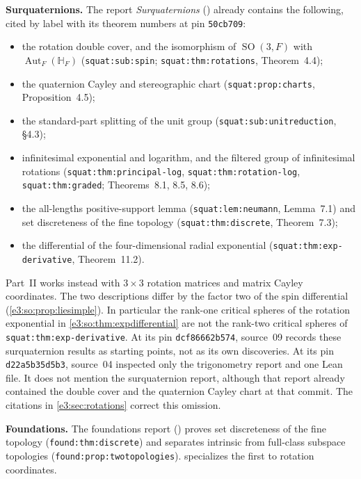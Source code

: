 \documentclass[11pt,letterpaper]{article}
\numberwithin{equation}{section}
\theoremstyle{definition}
\theoremstyle{remark}
\newcommand{\HH}{\mathbb H}
\newcommand{\SO}{\operatorname{SO}}
\newcommand{\Aut}{\operatorname{Aut}}
\begin{document}
\textbf{Surquaternions.} The report \emph{Surquaternions}
() \cite{RepoQuaternion} already
contains the following, cited by label with its theorem numbers at pin
\texttt{50cb709}:
\begin{itemize}
\item the rotation double cover, and the isomorphism of $\SO(3,F)$ with
 $\Aut_F(\HH_F)$ (\texttt{squat:sub:spin}; \texttt{squat:thm:rotations},
 Theorem~4.4);
\item the quaternion Cayley and stereographic chart (\texttt{squat:prop:charts},
 Proposition~4.5);
\item the standard-part splitting of the unit group
 (\texttt{squat:sub:unitreduction}, \S4.3);
\item infinitesimal exponential and logarithm, and the filtered group of
 infinitesimal rotations (\texttt{squat:thm:principal-log},
 \texttt{squat:thm:rotation-log}, \texttt{squat:thm:graded}; Theorems~8.1,
 8.5, 8.6);
\item the all-lengths positive-support lemma (\texttt{squat:lem:neumann},
 Lemma~7.1) and set discreteness of the fine topology
 (\texttt{squat:thm:discrete}, Theorem~7.3);
\item the differential of the four-dimensional radial exponential
 (\texttt{squat:thm:exp-derivative}, Theorem~11.2).
\end{itemize}
Part~II works instead with $3\times3$ rotation matrices and matrix Cayley
coordinates. The two descriptions differ by the factor two of the spin
differential (\cref{e3:so:prop:liesimple}). In particular the rank-one critical
spheres of the rotation exponential in \cref{e3:so:thm:expdifferential} are not
the rank-two critical spheres of \texttt{squat:thm:exp-derivative}. At its pin
\texttt{dcf86662b574}, source~09 records these surquaternion results as starting
points, not as its own discoveries. At its pin \texttt{d22a5b35d5b3}, source~04
inspected only the trigonometry report and one Lean file. It does not mention
the surquaternion report, although that report already contained the double cover and
the quaternion Cayley chart at that commit. The citations in
\cref{e3:sec:rotations} correct this omission.

\textbf{Foundations.} The foundations report
() \cite{RepoFoundations}
proves set discreteness of the fine topology (\texttt{found:thm:discrete}) and
separates intrinsic from full-class subspace topologies
(\texttt{found:prop:twotopologies}).  specializes the
first to rotation coordinates.
\end{document}
